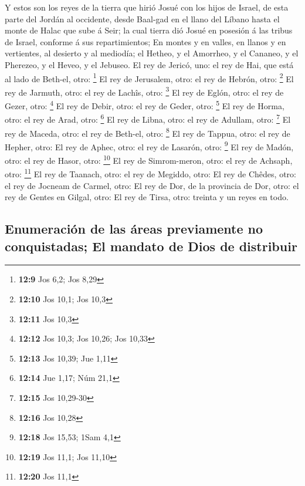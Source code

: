  Y estos son los reyes de la tierra que hirió Josué con
los hijos de Israel, de esta parte del Jordán al occidente, desde
Baal-gad en el llano del Líbano hasta el monte de Halac que sube á Seir;
la cual tierra dió Josué en posesión á las tribus de Israel, conforme á
sus repartimientos;  En montes y en valles, en llanos y en
vertientes, al desierto y al mediodía; el Hetheo, y el Amorrheo, y el
Cananeo, y el Pherezeo, y el Heveo, y el Jebuseo.  El rey
de Jericó, uno: el rey de Hai, que está al lado de Beth-el, otro:
\footnote{\textbf{12:9} Jos 6,2; Jos 8,29}  El rey de
Jerusalem, otro: el rey de Hebrón, otro: \footnote{\textbf{12:10} Jos
  10,1; Jos 10,3}  El rey de Jarmuth, otro: el rey de
Lachîs, otro: \footnote{\textbf{12:11} Jos 10,3}  El rey
de Eglón, otro: el rey de Gezer, otro: \footnote{\textbf{12:12} Jos
  10,3; Jos 10,26; Jos 10,33}  El rey de Debir, otro: el
rey de Geder, otro: \footnote{\textbf{12:13} Jos 10,39; Jue 1,11}
 El rey de Horma, otro: el rey de Arad, otro: \footnote{\textbf{12:14}
  Jue 1,17; Núm 21,1}  El rey de Libna, otro: el rey de
Adullam, otro: \footnote{\textbf{12:15} Jos 10,29-30}  El
rey de Maceda, otro: el rey de Beth-el, otro: \footnote{\textbf{12:16}
  Jos 10,28}  El rey de Tappua, otro: el rey de Hepher,
otro:  El rey de Aphec, otro: el rey de Lasarón, otro:
\footnote{\textbf{12:18} Jos 15,53; 1Sam 4,1}  El rey de
Madón, otro: el rey de Hasor, otro: \footnote{\textbf{12:19} Jos 11,1;
  Jos 11,10}  El rey de Simrom-meron, otro: el rey de
Achsaph, otro: \footnote{\textbf{12:20} Jos 11,1}  El rey
de Taanach, otro: el rey de Megiddo, otro:  El rey de
Chêdes, otro: el rey de Jocneam de Carmel, otro:  El rey
de Dor, de la provincia de Dor, otro: el rey de Gentes en Gilgal, otro:
 El rey de Tirsa, otro: treinta y un reyes en todo.

\hypertarget{enumeraciuxf3n-de-las-uxe1reas-previamente-no-conquistadas-el-mandato-de-dios-de-distribuir}{%
\subsection{Enumeración de las áreas previamente no conquistadas; El
mandato de Dios de
distribuir}\label{enumeraciuxf3n-de-las-uxe1reas-previamente-no-conquistadas-el-mandato-de-dios-de-distribuir}}

